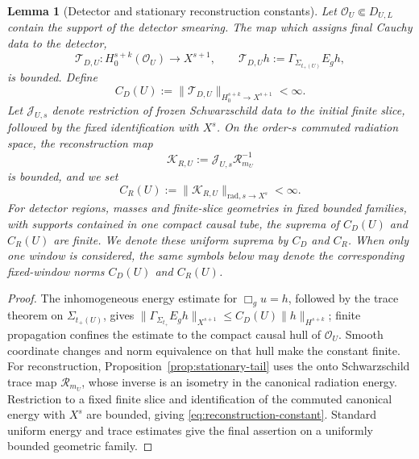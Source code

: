 \documentclass[11pt,a4paper]{article}
\newtheorem{lemma}[theorem]{Lemma}
\theoremstyle{definition}
\theoremstyle{remark}
\begin{document}
	\begin{lemma}[Detector and stationary reconstruction constants]
		\label{lem:detector-reconstruction-constants}
		Let $\mathcal O_U\Subset D_{U,L}$ contain the support of the detector
		smearing.  The map which assigns final Cauchy data to the detector,
		\begin{equation}
			\mathcal T_{D,U}:H^{s+k}_0(\mathcal O_U)\longrightarrow X^{s+1},
			\qquad
			\mathcal T_{D,U}h
			:=\Gamma_{\Sigma_{t_+(U)}}E_gh,
			\label{eq:detector-data-map}
		\end{equation}
		is bounded.  Define
		\begin{equation}
			C_D(U):=\|\mathcal T_{D,U}\|_{H^{s+k}_0\to X^{s+1}}<\infty.
			\label{eq:detector-constant}
		\end{equation}
		Let $\mathcal J_{U,s}$ denote restriction of frozen Schwarzschild data to the
		initial finite slice, followed by the fixed identification with $X^s$.  On
		the order-$s$ commuted radiation space, the reconstruction map
		\begin{equation}
			\mathcal K_{R,U}
			:=\mathcal J_{U,s}\mathcal R_{m_U}^{-1}
			\label{eq:reconstruction-map}
		\end{equation}
		is bounded, and we set
		\begin{equation}
			C_R(U):=\|\mathcal K_{R,U}\|_{\mathrm{rad},s\to X^s}<\infty.
			\label{eq:reconstruction-constant}
		\end{equation}
		For detector regions, masses and finite-slice geometries in fixed bounded
		families, with supports contained in one compact causal tube, the suprema of
		$C_D(U)$ and $C_R(U)$ are finite.  We denote these uniform suprema by $C_D$
		and $C_R$.  When only one window is considered, the same symbols below may
		denote the corresponding fixed-window norms $C_D(U)$ and $C_R(U)$.
	\end{lemma}
	
	\begin{proof}
		The inhomogeneous energy estimate for $\Box_g u=h$, followed by the trace
		theorem on $\Sigma_{t_+(U)}$, gives
		$\|\Gamma_{\Sigma_{t_+}}E_gh\|_{X^{s+1}}
		\leq C_D(U)\|h\|_{H^{s+k}}$; finite propagation confines the estimate to the
		compact causal hull of $\mathcal O_U$.  Smooth coordinate changes and norm
		equivalence on that hull make the constant finite.  For reconstruction,
		Proposition~\ref{prop:stationary-tail} uses the onto Schwarzschild trace map
		$\mathcal R_{m_U}$, whose inverse is an isometry in the canonical radiation
		energy.  Restriction to a fixed finite slice and identification of the
		commuted canonical energy with $X^s$ are bounded, giving
		\eqref{eq:reconstruction-constant}.  Standard uniform energy and trace
		estimates give the final assertion on a uniformly bounded geometric family.
	\end{proof}
	
\end{document}
